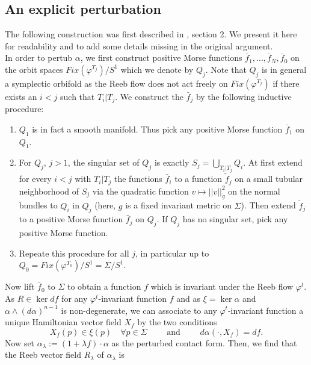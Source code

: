\documentclass[a4paper,12pt,bibliography=totocnumbered,titlepage=false,abstracton,bookmarksnumbered=true]{scrartcl}
\theoremstyle{definition}
\begin{document}
\subsection{An explicit perturbation}
The following construction was first described in \cite{Bour}, section 2. We present it here for readability and to add some details missing in the original argument.\\
In order to pertub $\alpha$, we first construct positive Morse functions $\bar{f}_1,..., \bar{f}_N,\bar{f}_0$ on the orbit spaces $Fix(\varphi^{T_j})\big/S^1$ which we denote by $Q_j$. Note that $Q_j$ is in general a symplectic orbifold as the Reeb flow does not act freely on $Fix(\varphi^{T_j})$ if there exists an $i<j$ such that $T_i|T_j$. We construct the $\bar{f}_j$ by the following inductive procedure:
\begin{enumerate}
 \item $Q_1$ is in fact a smooth manifold. Thus pick any positive Morse function $\bar{f}_1$ on $Q_1$.
 \item For $Q_j$, $j>1$, the singular set of $Q_j$ is exactly $S_j=\bigcup_{T_i|T_j} Q_i$. At first extend for every $i<j$ with $T_i|T_j$ the functions $\bar{f}_i$ to a function $\tilde{f}_j$ on a small tubular neighborhood of $S_j$ via the quadratic function $v\mapsto ||v||^2_g$ on the normal bundles to $Q_i$ in $Q_j$ (here, $g$ is a fixed invariant metric on $\Sigma$). Then extend $\tilde{f}_j$ to a positive Morse function $\bar{f}_j$ on $Q_j$. If $Q_j$ has no singular set, pick any positive Morse function.
 \item Repeate this procedure for all $j$, in particular up to $Q_0=Fix(\varphi^{T_0})\big/S^1=\Sigma\big/S^1$.
\end{enumerate}
Now lift $\bar{f}_0$ to $\Sigma$ to obtain a function $f$ which is invariant under the Reeb flow $\varphi^t$. As $R\in\ker df$ for any $\varphi^t$-invariant function $f$ and as $\xi=\ker \alpha$ and $\alpha\wedge(d\alpha)^{n-1}$ is non-degenerate, we can associate to any $\varphi^t$-invariant function a unique Hamiltonian vector field $X_f$ by the two conditions
\[X_f(p)\in\xi(p)\quad \forall p\in\Sigma\qquad\text{ and }\qquad d\alpha(\cdot, X_f)=df.\]
Now set $\alpha_\lambda:=(1{+}\lambda f){\cdot} \alpha$ as the perturbed contact form. Then, we find that the Reeb vector field $R_\lambda$ of $\alpha_\lambda$ is
\end{document}
